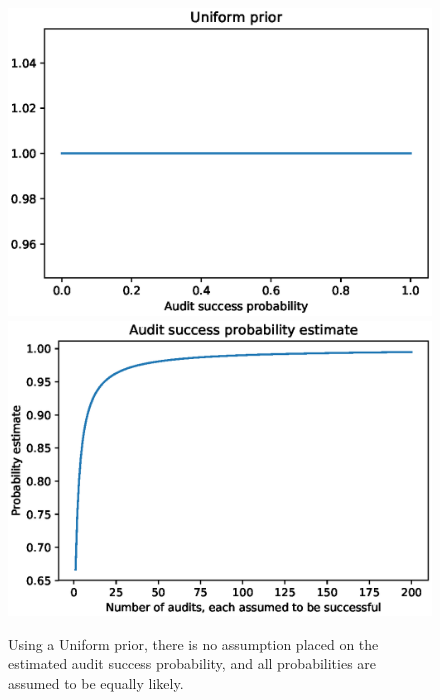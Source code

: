 \begin{figure}[ht]
    \centering
    \includegraphics[scale=0.8]{audit-success/uniform_prior.eps}
    \includegraphics[scale=0.8]{audit-success/uniform_estimate.eps}
\caption{Using a Uniform prior, there is no assumption placed on the estimated
audit success probability, and all probabilities are assumed to be equally likely.}
\label{fig:unif_prior}
\end{figure}

